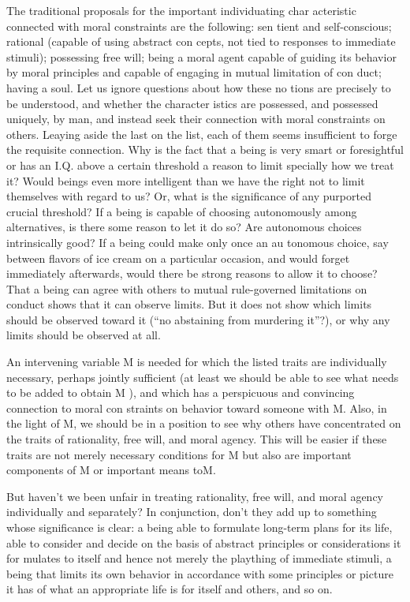 \documentclass[11pt,openany]{book}
\begin{document}
The traditional proposals for the important individuating char acteristic connected with moral constraints are the following: sen tient and self-conscious; rational (capable of using abstract con cepts, not tied to responses to immediate stimuli); possessing free will; being a moral agent capable of guiding its behavior by moral principles and capable of engaging in mutual limitation of con duct; having a soul. Let us ignore questions about how these no tions are precisely to be understood, and whether the character istics are possessed, and possessed uniquely, by man, and instead seek their connection with moral constraints on others. Leaying aside the last on the list, each of them seems insufficient to forge the requisite connection. Why is the fact that a being is very smart or foresightful or has an I.Q. above a certain threshold a reason to limit specially how we treat it? Would beings even more intelligent than we have the right not to limit themselves with regard to us? Or, what is the significance of any purported crucial threshold? If a being is capable of choosing autonomously among alternatives, is there some reason to let it do so? Are autonomous choices intrinsically good? If a being could make only once an au tonomous choice, say between flavors of ice cream on a particular occasion, and would forget immediately afterwards, would there be strong reasons to allow it to choose? That a being can agree with others to mutual rule-governed limitations on conduct shows that it can observe limits. But it does not show which limits should be observed toward it (``no abstaining from murdering it''?), or why any limits should be observed at all. 

An intervening variable M is needed for which the listed traits are individually necessary, perhaps jointly sufficient (at least we should be able to see what needs to be added to obtain M ), and which has a perspicuous and convincing connection to moral con straints on behavior toward someone with M. Also, in the light of M, we should be in a position to see why others have concentrated on the traits of rationality, free will, and moral agency. This will be easier if these traits are not merely necessary conditions for M but also are important components of M or important means toM. 

But haven't we been unfair in treating rationality, free will, and moral agency individually and separately? In conjunction, don't they add up to something whose significance is clear: a being able to formulate long-term plans for its life, able to consider and decide on the basis of abstract principles or considerations it for mulates to itself and hence not merely the plaything of immediate stimuli, a being that limits its own behavior in accordance with some principles or picture it has of what an appropriate life is for itself and others, and so on. 
\end{document}
